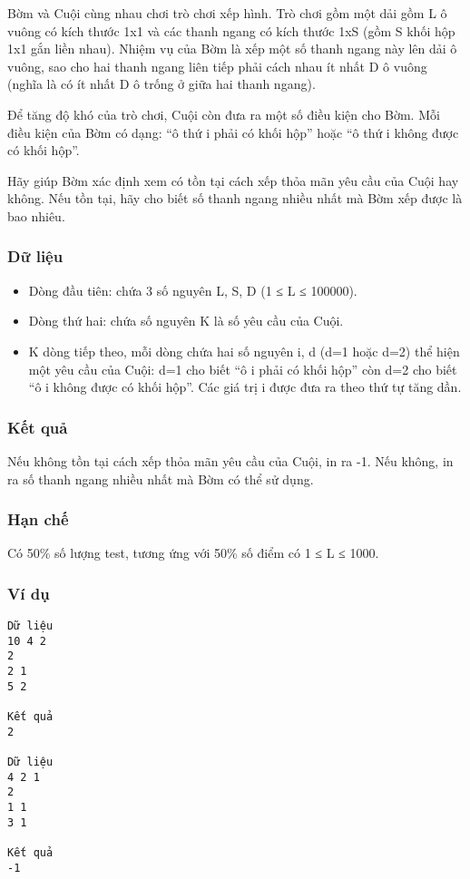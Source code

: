 

Bờm và Cuội cùng nhau chơi trò chơi xếp hình. Trò chơi gồm một dải gồm L ô vuông có kích thước 1x1 và các thanh ngang có kích thước 1xS (gồm S khối hộp 1x1 gắn liền nhau). Nhiệm vụ của Bờm là xếp một số thanh ngang này lên dải ô vuông, sao cho hai thanh ngang liên tiếp phải cách nhau ít nhất D ô vuông (nghĩa là có ít nhất D ô trống ở giữa hai thanh ngang).

Để tăng độ khó của trò chơi, Cuội còn đưa ra một số điều kiện cho Bờm. Mỗi điều kiện của Bờm có dạng: “ô thứ i phải có khối hộp” hoặc “ô thứ i không được có khối hộp”.

Hãy giúp Bờm xác định xem có tồn tại cách xếp thỏa mãn yêu cầu của Cuội hay không. Nếu tồn tại, hãy cho biết số thanh ngang nhiều nhất mà Bờm xếp được là bao nhiêu.

\subsubsection{Dữ liệu}
\begin{itemize}
	\item Dòng đầu tiên: chứa 3 số nguyên L, S, D (1 ≤ L ≤ 100000).
	\item Dòng thứ hai: chứa số nguyên K là số yêu cầu của Cuội.
	\item K dòng tiếp theo, mỗi dòng chứa hai số nguyên i, d (d=1 hoặc d=2) thể hiện một yêu cầu của Cuội: d=1 cho biết “ô i phải có khối hộp” còn d=2 cho biết “ô i không được có khối hộp”. Các giá trị i được đưa ra theo thứ tự tăng dần.
\end{itemize}

\subsubsection{Kết quả}

Nếu không tồn tại cách xếp thỏa mãn yêu cầu của Cuội, in ra -1. Nếu không, in ra số thanh ngang nhiều nhất mà Bờm có thể sử dụng.

\subsubsection{Hạn chế}

Có 50\% số lượng test, tương ứng với 50\% số điểm có 1 ≤ L ≤ 1000.

\subsubsection{Ví dụ}
\begin{verbatim}
Dữ liệu
10 4 2
2
2 1
5 2	

Kết quả
2

Dữ liệu
4 2 1
2
1 1
3 1	

Kết quả
-1
\end{verbatim}